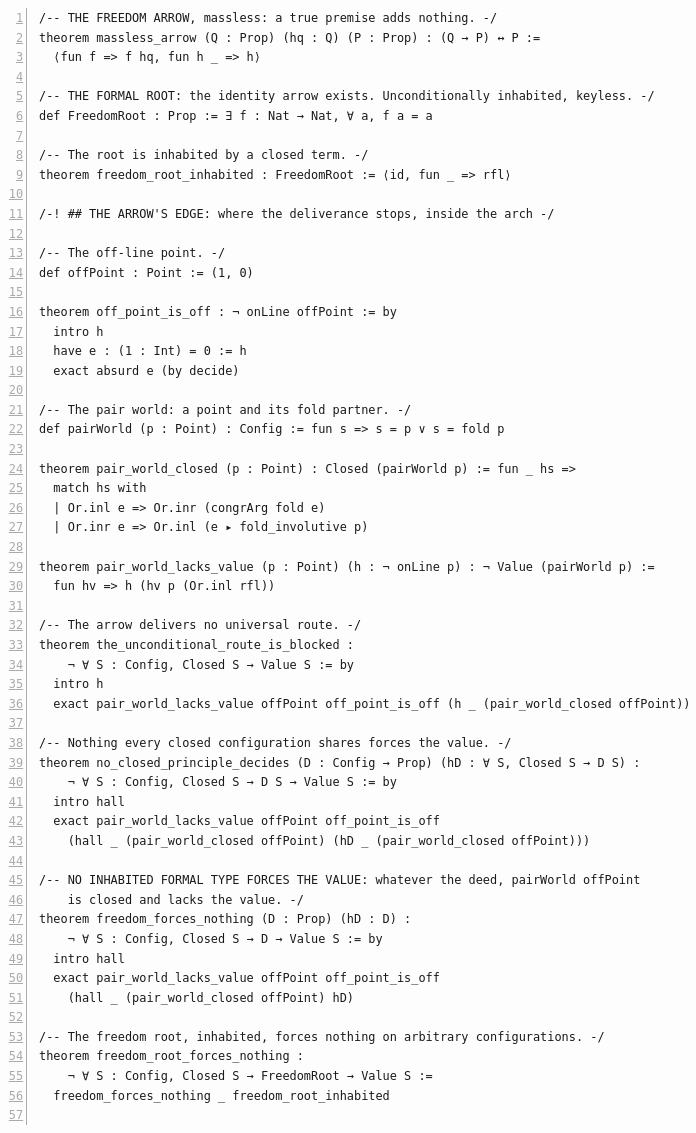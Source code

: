 \documentclass[10pt]{article}
\newcommand{\leansize}{\fontsize{5.5pt}{6.75pt}\selectfont}
\begin{document}
\begin{multicols}{2}
\begin{Verbatim}[numbers=left,firstnumber=1,numbersep=3pt,xleftmargin=2.6em,breaklines=true,breakanywhere=true,breakautoindent=false,breakindent=1.4em,breaksymbolleft={},breakanywheresymbolpre={},fontsize=\leansize]
/-- THE FREEDOM ARROW, massless: a true premise adds nothing. -/
theorem massless_arrow (Q : Prop) (hq : Q) (P : Prop) : (Q → P) ↔ P :=
  ⟨fun f => f hq, fun h _ => h⟩

/-- THE FORMAL ROOT: the identity arrow exists. Unconditionally inhabited, keyless. -/
def FreedomRoot : Prop := ∃ f : Nat → Nat, ∀ a, f a = a

/-- The root is inhabited by a closed term. -/
theorem freedom_root_inhabited : FreedomRoot := ⟨id, fun _ => rfl⟩

/-! ## THE ARROW'S EDGE: where the deliverance stops, inside the arch -/

/-- The off-line point. -/
def offPoint : Point := (1, 0)

theorem off_point_is_off : ¬ onLine offPoint := by
  intro h
  have e : (1 : Int) = 0 := h
  exact absurd e (by decide)

/-- The pair world: a point and its fold partner. -/
def pairWorld (p : Point) : Config := fun s => s = p ∨ s = fold p

theorem pair_world_closed (p : Point) : Closed (pairWorld p) := fun _ hs =>
  match hs with
  | Or.inl e => Or.inr (congrArg fold e)
  | Or.inr e => Or.inl (e ▸ fold_involutive p)

theorem pair_world_lacks_value (p : Point) (h : ¬ onLine p) : ¬ Value (pairWorld p) :=
  fun hv => h (hv p (Or.inl rfl))

/-- The arrow delivers no universal route. -/
theorem the_unconditional_route_is_blocked :
    ¬ ∀ S : Config, Closed S → Value S := by
  intro h
  exact pair_world_lacks_value offPoint off_point_is_off (h _ (pair_world_closed offPoint))

/-- Nothing every closed configuration shares forces the value. -/
theorem no_closed_principle_decides (D : Config → Prop) (hD : ∀ S, Closed S → D S) :
    ¬ ∀ S : Config, Closed S → D S → Value S := by
  intro hall
  exact pair_world_lacks_value offPoint off_point_is_off
    (hall _ (pair_world_closed offPoint) (hD _ (pair_world_closed offPoint)))

/-- NO INHABITED FORMAL TYPE FORCES THE VALUE: whatever the deed, pairWorld offPoint
    is closed and lacks the value. -/
theorem freedom_forces_nothing (D : Prop) (hD : D) :
    ¬ ∀ S : Config, Closed S → D → Value S := by
  intro hall
  exact pair_world_lacks_value offPoint off_point_is_off
    (hall _ (pair_world_closed offPoint) hD)

/-- The freedom root, inhabited, forces nothing on arbitrary configurations. -/
theorem freedom_root_forces_nothing :
    ¬ ∀ S : Config, Closed S → FreedomRoot → Value S :=
  freedom_forces_nothing _ freedom_root_inhabited


\end{Verbatim}
\end{multicols}
\end{document}

